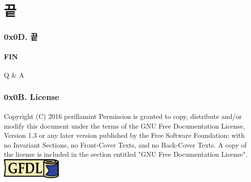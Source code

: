 \section[Section]{끝}
\begin{frame}
  \frametitle{0x0D. 끝}
  \framesubtitle{FIN}

  \begin{center}
    Q \& A
  \end{center}
\end{frame}

\begin{frame}
  \frametitle{0x0B. License}
  \framesubtitle{}
  Copyright (C)  2016 perillamint\linebreak
  Permission is granted to copy, distribute and/or modify this document
  under the terms of the GNU Free Documentation License, Version 1.3
  or any later version published by the Free Software Foundation;\linebreak
  with no Invariant Sections, no Front-Cover Texts, and no Back-Cover Texts.
  A copy of the license is included in the section entitled "GNU
  Free Documentation License".
  \linebreak
  \linebreak
  \linebreak
  \linebreak
  \includegraphics [width=30mm]{img/gfdl-logo-small.png}
\end{frame}


